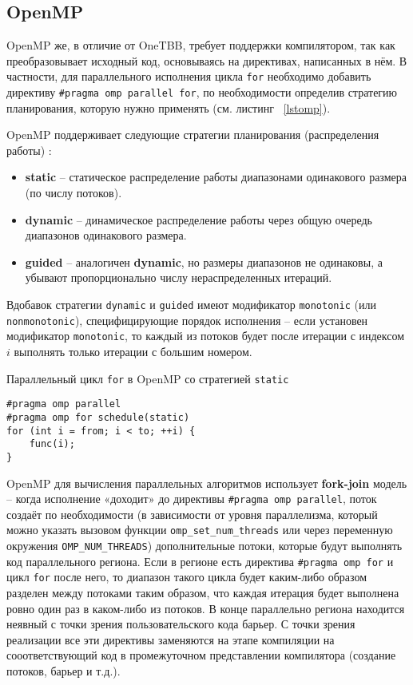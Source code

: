 \documentclass[times,specification,annotation]{itmo-student-thesis}
\begin{document}
\subsection{OpenMP}
OpenMP же, в отличие от OneTBB, требует поддержки компилятором, так как преобразовывает исходный код, основываясь на директивах, написанных в нём. В частности, для параллельного исполнения цикла \texttt{for} необходимо добавить директиву \texttt{\#pragma omp parallel for}, по необходимости определив стратегию планирования, которую нужно применять (см. листинг ~\ref{lstomp}).

OpenMP поддерживает следующие стратегии планирования (распределения работы) \cite{omp-spec}:
\begin{itemize}
    \item \textbf{static} -- статическое распределение работы диапазонами одинакового размера (по числу потоков).
    \item \textbf{dynamic} -- динамическое распределение работы через общую очередь диапазонов одинакового размера.
    \item \textbf{guided} -- аналогичен \textbf{dynamic}, но размеры диапазонов не одинаковы, а убывают пропорционально числу нераспределенных итераций.
\end{itemize}

Вдобавок стратегии \texttt{dynamic} и \texttt{guided} имеют модификатор \texttt{monotonic} (или \texttt{nonmonotonic}), специфицирующие порядок исполнения -- если установен модификатор \texttt{monotonic}, то каждый из потоков будет после итерации с индексом $i$ выполнять только итерации с большим номером.

\begin{algorithm}[!h]
\caption{Параллельный цикл \texttt{for} в OpenMP со стратегией \texttt{static}}\label{lstomp}
\begin{lstlisting}
#pragma omp parallel 
#pragma omp for schedule(static)
for (int i = from; i < to; ++i) {
    func(i);
}
\end{lstlisting}
\end{algorithm}

OpenMP для вычисления параллельных алгоритмов использует \textbf{fork-join} модель -- когда исполнение «доходит» до директивы \texttt{\#pragma omp parallel}, поток создаёт по необходимости (в зависимости от уровня параллелизма, который можно указать вызовом функции \texttt{omp\_set\_num\_threads} или через переменную окружения \texttt{OMP\_NUM\_THREADS}) дополнительные потоки, которые будут выполнять код параллельного региона. Если в регионе есть директива \texttt{\#pragma omp for} и цикл \texttt{for} после него, то диапазон такого цикла будет каким-либо образом разделен между потоками таким образом, что каждая итерация будет выполнена ровно один раз в каком-либо из потоков. В конце параллельно региона находится неявный с точки зрения пользовательского кода барьер.  С точки зрения реализации все эти директивы заменяются на этапе компиляции на сооответствующий код в промежуточном представлении компилятора (создание потоков, барьер и т.д.).
\end{document}
